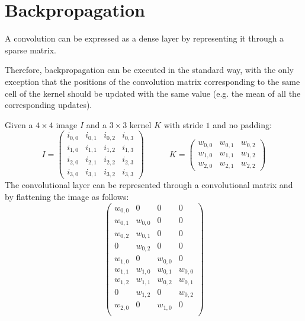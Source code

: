 \section{Backpropagation}

A convolution can be expressed as a dense layer by representing it through a sparse matrix.

Therefore, backpropagation can be executed in the standard way, 
with the only exception that the positions of the convolution matrix corresponding to 
the same cell of the kernel should be updated with the same value (e.g. the mean of all the corresponding updates).

\begin{example}
    Given a $4 \times 4$ image $I$ and a $3 \times 3$ kernel $K$ with stride $1$ and no padding:
    \[
        I = \begin{pmatrix} i_{0,0} & i_{0,1} & i_{0,2} & i_{0,3} \\ i_{1,0} & i_{1,1} & i_{1,2} & i_{1,3} \\ 
            i_{2,0} & i_{2,1} & i_{2,2} & i_{2,3} \\ i_{3,0} & i_{3,1} & i_{3,2} & i_{3,3} 
        \end{pmatrix} 
        \hspace{3em}
        K = \begin{pmatrix} w_{0,0} & w_{0,1} & w_{0,2} \\ w_{1,0} & w_{1,1} & w_{1,2} \\ w_{2,0} & w_{2,1} & w_{2,2} \end{pmatrix}
    \]
    The convolutional layer can be represented through a convolutional matrix and by flattening the image as follows:
    \[  
        \begin{pmatrix}
            w_{0,0} & 0         & 0         & 0         \\
            w_{0,1} & w_{0,0}   & 0         & 0         \\
            w_{0,2} & w_{0,1}   & 0         & 0         \\
            0       & w_{0,2}   & 0         & 0         \\
            w_{1,0} & 0         & w_{0,0}   & 0         \\
            w_{1,1} & w_{1,0}   & w_{0,1}   & w_{0,0}   \\
            w_{1,2} & w_{1,1}   & w_{0,2}   & w_{0,1}   \\
            0       & w_{1,2}   & 0         & w_{0,2}   \\
            w_{2,0} & 0         & w_{1,0}   & 0         \\

\end{pmatrix}\]
\end{example}
